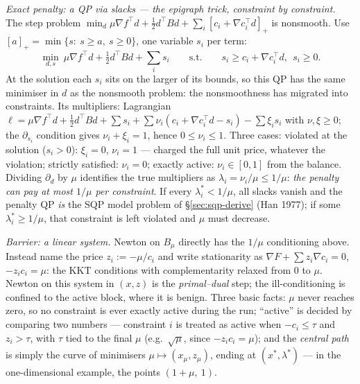 \documentclass[11pt,a4paper]{article}
\newcommand{\T}{^{\!\top}}
\begin{document}
\emph{Exact penalty: a QP via slacks --- the epigraph trick, constraint by constraint.}
The step problem $\min_d\mu\nabla f\T d+\tfrac12d\T Bd+\sum_i[c_i+\nabla c_i\T d]_+$ is
nonsmooth.  Use $[a]_+=\min\{s:\ s\ge a,\ s\ge0\}$, one variable $s_i$ per term:
\[
\min_{d,s}\ \mu\nabla f\T d+\tfrac12d\T Bd+\sum_is_i
\qquad\text{s.t.}\qquad s_i\ge c_i+\nabla c_i\T d,\ \ s_i\ge0 .
\]
At the solution each $s_i$ sits on the larger of its bounds, so this QP has the same
minimiser in $d$ as the nonsmooth problem: the nonsmoothness has migrated into
constraints.  Its multipliers: Lagrangian
$\ell=\mu\nabla f\T d+\tfrac12d\T Bd+\sum s_i+\sum\nu_i(c_i+\nabla c_i\T d-s_i)-\sum\xi_is_i$
with $\nu,\xi\ge0$; the $\partial_{s_i}$ condition gives $\nu_i+\xi_i=1$, hence
$0\le\nu_i\le1$.  Three cases: violated at the solution ($s_i>0$): $\xi_i=0$, $\nu_i=1$
--- charged the full unit price, whatever the violation; strictly satisfied: $\nu_i=0$;
exactly active: $\nu_i\in[0,1]$ from the balance.  Dividing $\partial_d$ by $\mu$
identifies the true multipliers as $\lambda_i=\nu_i/\mu\le1/\mu$: \emph{the penalty can
pay at most $1/\mu$ per constraint}.  If every $\lambda_i^\ast<1/\mu$, all slacks vanish
and the penalty QP \emph{is} the SQP model problem of \S\ref{sec:sqp-derive} (Han 1977);
if some $\lambda_i^\ast\ge1/\mu$, that constraint is left violated and $\mu$ must
decrease.

\emph{Barrier: a linear system.}  Newton on $B_\mu$ directly has the $1/\mu$
conditioning above.  Instead name the price $z_i:=-\mu/c_i$ and write stationarity as
$\nabla F+\sum z_i\nabla c_i=0$, $-z_ic_i=\mu$: the KKT conditions with complementarity
relaxed from $0$ to $\mu$.  Newton on this system in $(x,z)$ is the \emph{primal--dual}
step; the ill-conditioning is confined to the active block, where it is benign.  Three
basic facts: $\mu$ never reaches zero, so no constraint is ever exactly active during the
run; ``active'' is decided by comparing two numbers --- constraint $i$ is treated as
active when $-c_i\le\tau$ and $z_i>\tau$, with $\tau$ tied to the final $\mu$ (e.g.\
$\sqrt\mu$, since $-z_ic_i=\mu$); and the \emph{central path} is simply the curve of
minimisers $\mu\mapsto(x_\mu,z_\mu)$, ending at $(x^\ast,\lambda^\ast)$ --- in the
one-dimensional example, the points $(1+\mu,\ 1)$.
\end{document}
